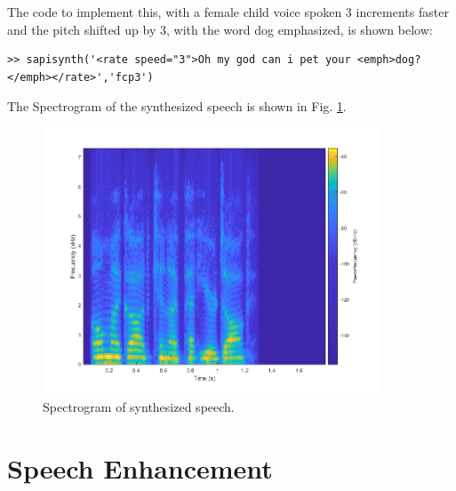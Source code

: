 \documentclass[letterpaper]{article}
\begin{document}
The code to implement this, with a female child voice spoken 3 increments faster and the pitch shifted up by 3, with the word dog emphasized, is shown below:

\begin{lstlisting}[caption = {Sentence of speech that was synthesized.}]
>> sapisynth('<rate speed="3">Oh my god can i pet your <emph>dog?</emph></rate>','fcp3')

\end{lstlisting}

The Spectrogram of the synthesized speech is shown in Fig. \ref{fig:spec}.

\begin{figure}[h!]
    \centering
    \includegraphics[width=10cm]{ee599hw5p3}
    \caption{Spectrogram of synthesized speech.}
    \label{fig:spec}
\end{figure}


\section{Speech Enhancement}





\end{document}
